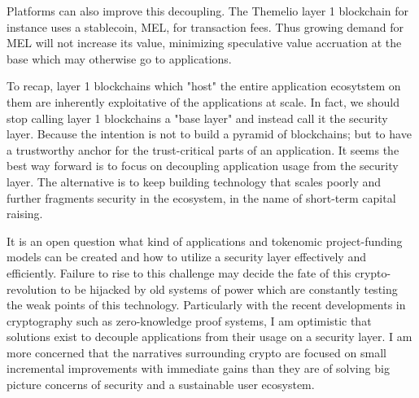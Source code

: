 Platforms can also improve this decoupling. The Themelio layer 1 blockchain for instance uses a stablecoin, MEL, for transaction fees. Thus growing demand for MEL will not increase its value, minimizing speculative value accruation at the base which may otherwise go to applications.

To recap, layer 1 blockchains which "host" the entire application ecosytstem on them are inherently exploitative of the applications at scale. In fact, we should stop calling layer 1 blockchains a "base layer" and instead call it the security layer. Because the intention is not to build a pyramid of blockchains; but to have a trustworthy anchor for the trust-critical parts of an application. It seems the best way forward is to focus on decoupling application usage from the security layer. The alternative is to keep building technology that scales poorly and further fragments security in the ecosystem, in the name of short-term capital raising.

It is an open question what kind of applications and tokenomic project-funding models can be created and how to utilize a security layer effectively and efficiently. Failure to rise to this challenge may decide the fate of this crypto-revolution to be hijacked by old systems of power which are constantly testing the weak points of this technology. Particularly with the recent developments in cryptography such as zero-knowledge proof systems, I am optimistic that solutions exist to decouple applications from their usage on a security layer. I am more concerned that the narratives surrounding crypto are focused on small incremental improvements with immediate gains than they are of solving big picture concerns of security and a sustainable user ecosystem.
